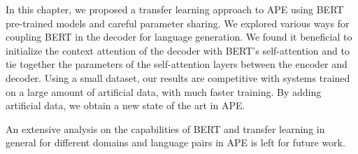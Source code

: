 In this chapter, we proposed a transfer learning approach to APE using
BERT pre-trained models and careful parameter sharing. We explored
various ways for coupling BERT in the decoder for language
generation. We found it beneficial to initialize the context
attention of the decoder with BERT's self-attention and to tie
together the parameters of the self-attention layers between the
encoder and decoder. Using a small dataset, our results are
competitive with systems trained on a large amount of artificial
data, with much faster training. By adding artificial data, we obtain
a new state of the art in APE.

An extensive analysis on the capabilities of BERT and transfer
learning in general for different domains and language pairs in APE
is left for future work.

\cleardoublepage
